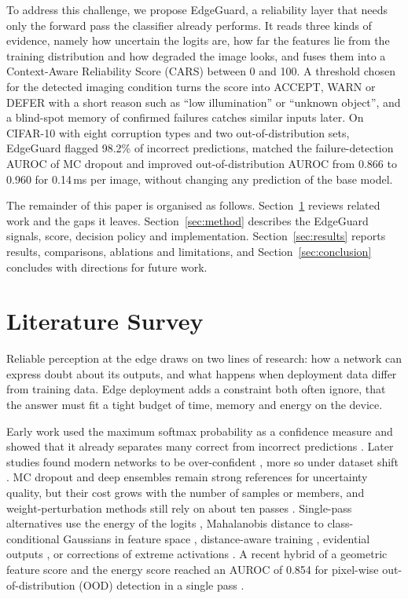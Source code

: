 \documentclass[conference]{IEEEtran}
\begin{document}
To address this challenge, we propose EdgeGuard, a reliability layer that needs only the forward pass the classifier already performs. It reads three kinds of evidence, namely how uncertain the logits are, how far the features lie from the training distribution and how degraded the image looks, and fuses them into a Context-Aware Reliability Score (CARS) between 0 and 100. A threshold chosen for the detected imaging condition turns the score into ACCEPT, WARN or DEFER with a short reason such as ``low illumination'' or ``unknown object'', and a blind-spot memory of confirmed failures catches similar inputs later. On CIFAR-10 with eight corruption types and two out-of-distribution sets, EdgeGuard flagged 98.2\% of incorrect predictions, matched the failure-detection AUROC of MC dropout and improved out-of-distribution AUROC from 0.866 to 0.960 for 0.14\,ms per image, without changing any prediction of the base model.

The remainder of this paper is organised as follows. Section~\ref{sec:lit} reviews related work and the gaps it leaves. Section~\ref{sec:method} describes the EdgeGuard signals, score, decision policy and implementation. Section~\ref{sec:results} reports results, comparisons, ablations and limitations, and Section~\ref{sec:conclusion} concludes with directions for future work.

\section{Literature Survey}
\label{sec:lit}

Reliable perception at the edge draws on two lines of research: how a network can express doubt about its outputs, and what happens when deployment data differ from training data. Edge deployment adds a constraint both often ignore, that the answer must fit a tight budget of time, memory and energy on the device.

Early work used the maximum softmax probability as a confidence measure and showed that it already separates many correct from incorrect predictions \cite{hendrycks2017baseline}. Later studies found modern networks to be over-confident \cite{guo2017calibration}, more so under dataset shift \cite{ovadia2019trust}. MC dropout \cite{gal2016dropout} and deep ensembles \cite{lakshminarayanan2017ensembles} remain strong references for uncertainty quality, but their cost grows with the number of samples or members, and weight-perturbation methods still rely on about ten passes \cite{zhang2025tulip}. Single-pass alternatives use the energy of the logits \cite{liu2020energy}, Mahalanobis distance to class-conditional Gaussians in feature space \cite{lee2018mahalanobis}, distance-aware training \cite{vanamersfoort2020duq,liu2020sngp}, evidential outputs \cite{sensoy2018evidential,yoon2024daedl}, or corrections of extreme activations \cite{azizmalayeri2024cea}. A recent hybrid of a geometric feature score and the energy score reached an AUROC of 0.854 for pixel-wise out-of-distribution (OOD) detection in a single pass \cite{zhang2026neco}.
\end{document}

